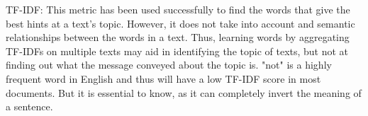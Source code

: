 TF-IDF: This metric has been used successfully to find the words that give the best hints at a text's topic.
However, it does not take into account and semantic relationships between the words in a text.
Thus, learning words by aggregating TF-IDFs on multiple texts may aid in identifying the topic of texts, but not at finding out what the message conveyed about the topic is.
"not" is a highly frequent word in English and thus will have a low TF-IDF score in most documents.
But it is essential to know, as it can completely invert the meaning of a sentence.




